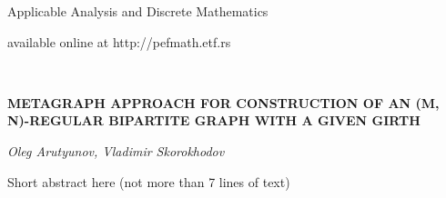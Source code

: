 \documentclass[leqno]{aadmbook}
\begin{document}

\oddsidemargin 16.5mm
\evensidemargin 16.5mm

\thispagestyle{plain}

\begin{center}
{\large \sc  Applicable Analysis and Discrete Mathematics}

{\small available online at  http:/$\!$/pefmath.etf.rs }
\end{center}

\\

\vspace{5cc}
\begin{center}

{\large\bf  METAGRAPH APPROACH FOR CONSTRUCTION OF AN (M, N)-REGULAR BIPARTITE GRAPH WITH A GIVEN GIRTH
\rule{0mm}{6mm}\renewcommand{\thefootnote}{}%


}

\vspace{1cc}
{\large\it Oleg Arutyunov, Vladimir Skorokhodov}

\vspace{1cc}
\parbox{24cc}{{\small

Short abstract here (not more than 7 lines of text)


}}
\end{center}

\end{document}

